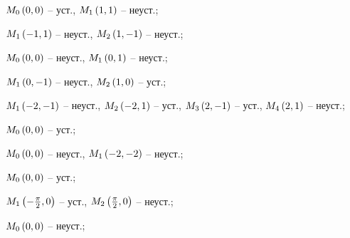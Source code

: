 \begin{enumsols}
		\label{sol:stability_zeros:firstapprox2d}
		\item \( M_0 \left( 0, 0 \right) \) -- уст., \( M_1 \left( 1, 1 \right) \) -- неуст.; %
		\item \( M_1 \left( -1, 1 \right) \) -- неуст., \( M_2 \left( 1, -1 \right) \) -- неуст.; %
		\item \( M_0 \left( 0, 0 \right) \) -- неуст., \( M_1 \left( 0, 1 \right) \) -- неуст.;  %
		\item \( M_1 \left( 0, -1 \right) \) -- неуст., \( M_2 \left( 1, 0 \right) \) -- уст.; %
		\item \( M_1 \left( -2, -1 \right) \) -- неуст., \( M_2 \left( -2, 1 \right) \) -- уст., \( M_3 \left( 2, -1 \right) \) -- уст., \( M_4 \left( 2, 1 \right) \) -- неуст.; %
		\item \( M_0 \left( 0, 0 \right) \) -- уст.; %
		\item \( M_0 \left( 0, 0 \right) \) -- неуст., \( M_1 \left( -2, -2 \right) \) -- неуст.; %
		\item \( M_0 \left( 0, 0 \right) \) -- уст.; %
		\item \( M_1 \left( -\frac{\pi}{2}, 0 \right) \) -- уст., \( M_2 \left( \frac{\pi}{2}, 0 \right) \) -- неуст.; %
		\item \( M_0 \left( 0, 0 \right) \) -- неуст.; %


\end{enumsols}
